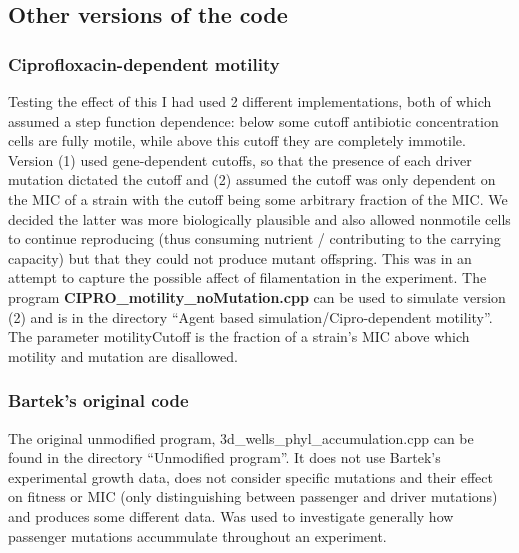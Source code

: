 \documentclass[a4paper,10pt]{article}
\begin{document}
\subsection{Other versions of the code}


\subsubsection{Ciprofloxacin-dependent motility}
Testing the effect of this I had used 2 different implementations, both of which assumed a step function dependence: below some cutoff antibiotic concentration cells
are fully motile, while above this cutoff they are completely immotile. Version (1) used gene-dependent cutoffs, so that the presence of each driver mutation dictated
the cutoff and (2) assumed the cutoff was only dependent on the MIC of a strain with the cutoff being some arbitrary fraction of the MIC. 
We decided the latter was more biologically plausible and also allowed nonmotile cells
to continue reproducing (thus consuming nutrient / contributing to the carrying capacity) but that they could not produce mutant offspring. This was in an attempt
to capture the possible affect of filamentation in the experiment.
The program {\bf CIPRO\_motility\_noMutation.cpp} can be used to simulate version (2) and is in the directory ``Agent based simulation/Cipro-dependent motility''. The parameter
motilityCutoff is the fraction of a strain's MIC above which motility and mutation are disallowed.


\subsubsection{Bartek's original code}
The original unmodified program, 3d\_wells\_phyl\_accumulation.cpp can be found in the directory ``Unmodified program''.
It does not use Bartek's experimental growth data, does not consider specific mutations and their effect on fitness or MIC 
(only distinguishing between passenger and driver mutations) and produces some different data.
Was used to investigate generally how passenger mutations accummulate throughout an experiment.
\end{document}

